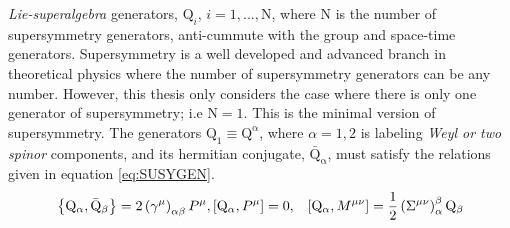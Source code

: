 \newline
\textit{Lie-superalgebra} generators, $\mathrm{Q}_{i}$, $i = 1,...,\mathrm{N}$, where $\mathrm{N}$ is the number of supersymmetry generators, anti-cummute with the group and space-time generators.  %
Supersymmetry is a well developed and advanced branch in theoretical physics where the number of supersymmetry generators can be any number. However, this thesis only considers the case where there is only one generator of supersymmetry; i.e $\mathrm{N} = 1$. This is the minimal  version of supersymmetry. 
 The generators $\mathrm{Q_{1}} \equiv \mathrm{Q^{\alpha}}$, where $\alpha=1,2$ is labeling \textit{Weyl or two spinor} components,  and its hermitian conjugate, $\mathrm{\bar{Q}_{\alpha}}$, must satisfy the relations given in equation \ref{eq:SUSYGEN}.
\begin{eqnarray}{\label{eq:SUSYGEN}}             
\left\lbrace\mathrm{Q_{\alpha}}, \mathrm{\bar{Q}_{\beta}}\right\rbrace =  2\left(\gamma^{\mu}\right)_{\alpha\beta}P^{\mu}, &
\left[\mathrm{Q_{\alpha}},P^{\mu}\right] = 0, &
\left[\mathrm{Q_{\alpha}}, M^{\mu\nu}\right] =\frac{1}{2}\left(\Sigma^{\mu\nu}\right)_{\alpha}^{\beta}\mathrm{Q_{\beta}}
\end{eqnarray}

